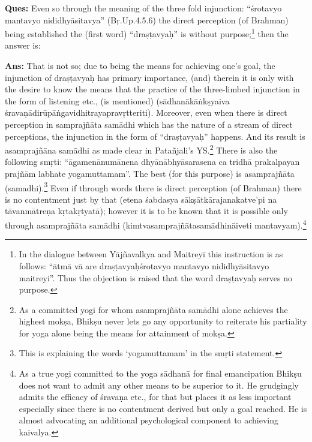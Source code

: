 \textbf{Ques:} Even so through the meaning of the three fold injunction: “śrotavyo mantavyo nididhyāsitavya” (Bṛ.Up.4.5.6) the direct perception (of Brahman) being established  the (first word) “draṣṭavyaḥ” is without purpose;\footnote{In the dialogue between Yājñavalkya and Maitreyī this instruction is as follows: “ātmā vā are draṣṭavyaḥśrotavyo mantavyo nididhyāsitavyo maitreyi”. Thus the objection is raised that the word draṣṭavyaḥ serves no purpose.} then the answer is:

\textbf{Ans:} That is not so; due to being the means for achieving one’s goal, the injunction of draṣṭavyaḥ has primary importance, (and) therein it is only with the desire to know the means that the practice of the three-limbed injunction in the form of listening etc., (is mentioned) (sādhanākāṅkṣyaiva śravaṇādirūpāṅgavidhitrayapravṛtteriti). Moreover, even when there is direct perception in samprajñāta samādhi which has the nature of a stream of direct perceptions, the injunction in the form of “draṣṭavyaḥ” happens. And its result is asamprajñāna samādhi as made clear in  Patañjali’s YS.\footnote{As a committed yogi for whom asamprajñāta samādhi alone achieves the highest mokṣa, Bhikṣu never lets go any opportunity to reiterate his partiality for yoga alone being the means for attainment of mokṣa.} There is also the following smṛti: “āgamenānumānena   dhyānābhyāsarasena ca tridhā prakal\-payan prajñām labhate yogamuttamam”. The best (for this purpose) is asamprajñāta (samadhi).\footnote{This is explaining the words ‘yogamuttamam’ in the smṛti statement.} Even if through words there is direct perception (of Brahman) there is no contentment just by that (etena śabdasya sākṣātkārajanakatve’pi na tāvanmātreṇa kṛtakṛtyatā); however it is to be known that it is possible only through asamprajñāta samādhi (kimtvasamprajñātasamādhināiveti mantavyam).\footnote{As a true yogi committed to the yoga sādhanā for final emancipation Bhikṣu does not want to admit any other means to be superior to it. He grudgingly admits the efficacy of śravaṇa etc., for that but places it as less important especially since there is no contentment derived but only a goal reached. He is almost advocating an additional psychological component to achieving kaivalya.}


